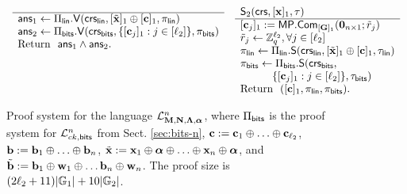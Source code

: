 \begin{figure}
\begin{\algSize}
$$\begin{array}{ll}
\begin{array}{l}
\hline
\mathsf{ans}_1 \gets
    \Pi_{\mathsf{lin}}.\mathsf{V}
    (
        \mathsf{crs}_{\mathsf{lin}},
            [{\tilde{\mathbf{x}}}]_1\oplus
            [\mathbf{c}]_1,
        \pi_{\mathsf{lin}}
    )\\
\mathsf{ans}_2 \gets \Pi_{\mathsf{bits}}.\mathsf{V}(\mathsf{crs}_{\mathsf{bits}},\{[\mathbf{c}_j]_1:j\in[{\ell_2}]\},\pi_{\mathsf{bits}})\\
\text{Return } \ \mathsf{ans}_1\wedge\mathsf{ans}_2.
\\
\\
\\
\\
\end{array}
&
\begin{array}{l}
{\mathsf{S}_2(\mathsf{crs},[\mathbf{x}]_1,\tau)}\\
\hline
{[\mathbf{c}_j]_1} := \mathsf{MP}.\mathsf{Com}_{[\mathbf{{G}}]_1}(\mathbf{{0}}_{n\times 1};\tilde{{r}}_j)\\
\tilde{{r}}_j\gets\mathbb{Z}_q^{\ell_2}, \forall j\in[{\ell_2}]\\
\pi_{\mathsf{lin}} \gets 
    \Pi_{\mathsf{lin}}.\mathsf{S}
    (
        \mathsf{crs}_{\mathsf{lin}},
            [{\tilde{\mathbf{x}}}]_1\oplus
            [\mathbf{c}]_1,
       \tau_{\mathsf{lin}}
    )\\
\pi_{\mathsf{bits}} \gets
    \Pi_{\mathsf{bits}}.\mathsf{S}
    (
        \mathsf{crs}_{\mathsf{bits}},\\
\qquad\quad  \{[\mathbf{c}_j]_1:j\in[{\ell_2}]\},
        \tau_{\mathsf{bits}}
    )\\
\text{Return } \  ([\mathbf{c}]_1,\pi_{\mathsf{lin}},\pi_{\mathsf{bits}}). \\
\end{array}
\end{array}$$
\end{\algSize}
\caption{Proof system for the language $\mathcal{L}_{\mathbf{{M}},\mathbf{{N}},\mathbf{{\Lambda}},{\boldsymbol \alpha}}^n$, where $\Pi_{\mathsf{bits}}$ is the proof system for $\mathcal{L}_{ck,\mathsf{bits}}^n$ from Sect. \ref{sec:bits-n}, $\mathbf{c}:=\mathbf{c}_1\oplus\ldots\oplus\mathbf{c}_{\ell_2}$, $\mathbf{b}:=\mathbf{b}_1\oplus\ldots\oplus\mathbf{b}_n$, ${\tilde{\mathbf{x}}}:=\mathbf{x}_1\oplus{\boldsymbol \alpha}\oplus\ldots\oplus\mathbf{x}_n\oplus{\boldsymbol \alpha}$, and $\tilde{\mathbf{b}}:=\mathbf{b}_1\oplus\mathbf{w}_1\oplus\ldots\mathbf{b}_n\oplus\mathbf{w}_n$. The proof size is $(2{\ell_2}+11)|\mathbb{G}_1|+10|\mathbb{G}_2|$.\label{fig:bin-leng-nizk}}
\end{figure}
%
